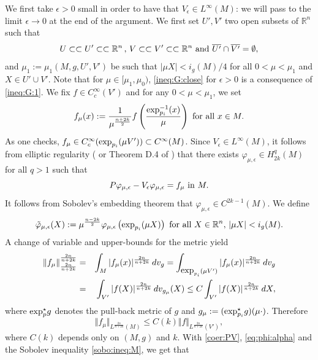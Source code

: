 \documentclass[reqno]{amsart}
\def \rn {\mathbb{R}^n}
\def \eps {\epsilon}
\begin{document}
 We first take $\eps>0$ small in order to have that $V_\eps\in L^\infty(M)$: we will pass to the limit $\eps\to 0$ at the end of the argument. We first set $U',V'$ two open subsets of $\rn$ such that
\begin{equation*}
 U\subset\subset U'\subset\subset \rn \, ,\, V\subset\subset V'\subset\subset \rn\hbox{ and }\overline{U'}\cap\overline{V'}=\emptyset,
\end{equation*}
and $\mu_1:=\mu_1(M,g,U',V')$ be such that $|\mu X|<i_g(M)/4$ for all $0<\mu<\mu_1$ and $X\in U'\cup V'$. Note that for $\mu\in [\mu_1,\mu_0)$, \eqref{ineq:G:close} for $\eps>0$ is a consequence of \eqref{ineq:G:1}. We fix $f\in C^\infty_c(V')$ and for any $0<\mu<\mu_1$, we set 
$$f_\mu(x):=\frac{1}{\mu^{\frac{n+2k}{2}}}f\left(\frac{\hbox{exp}_{p_i}^{-1}(x)}{\mu}\right)\hbox{ for all }x\in M.$$
As one checks, $f_\mu\in C^\infty_c(\hbox{exp}_{p_i}(\mu V'))\subset C^\infty(M)$. Since $V_\eps\in L^\infty(M)$, it follows from elliptic regularity (\cite{ADN} or Theorem D.4 of \cite{robert:gjms})  that there exists $\varphi_{\mu,\eps}\in H_{2k}^q(M)$ for all $q>1$ such that
\begin{equation}\label{eq:phi:alpha}
P\varphi_{\mu,\eps}-V_\eps\varphi_{\mu,\eps}=f_\mu\hbox{ in }M.
\end{equation}
It follows from Sobolev's embedding theorem that $\varphi_{\mu,\eps}\in C^{2k-1}(M)$. We define
\begin{equation*}
\tilde{\varphi}_{\mu,\eps}(X):= \mu^{\frac{n-2k}{2}}\varphi_{\mu,\eps}\left(\hbox{exp}_{p_i}(\mu X)\right)\hbox{ for all }X\in \rn ,\, |\mu X|<i_g(M).
\end{equation*}
A change of variable and upper-bounds for the metric yield
\begin{eqnarray*}
\Vert f_\mu\Vert_{\frac{2n}{n+2k}}^{\frac{2n}{n+2k}}&=&\int_M |f_\mu(x)|^{\frac{2n}{n+2k}}\, dv_g=\int_{\hbox{exp}_{p_i}(\mu V')} |f_\mu(x)|^{\frac{2n}{n+2k}}\, dv_g\\
&=& \int_{V'} |f(X)|^{\frac{2n}{n+2k}}\, dv_{g_\mu}(X)\leq C\int_{V'} |f(X)|^{\frac{2n}{n+2k}}\, dX,
\end{eqnarray*}
where $\hbox{exp}_p^\star g$ denotes the pull-back metric of $g$ and  $g_\mu:=(\hbox{exp}_{p_i}^\star g)(\mu\cdot)$. Therefore
\begin{equation}\label{eq:31}
\Vert f_\mu\Vert_{L^{\frac{2n}{n+2k}}(M)}\leq C(k)\Vert f\Vert_{L^{\frac{2n}{n+2k}}(V')},
\end{equation}
where $C(k)$ depends only on $(M,g)$ and $k$. With \eqref{coer:PV}, \eqref{eq:phi:alpha} and the Sobolev inequality \eqref{sobo:ineq:M}, we get that
\end{document}
